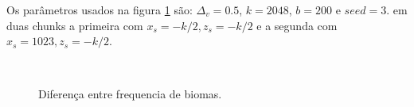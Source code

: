 Os parâmetros usados na figura \ref{fig:biomeareasanotherComp} são: $\Delta_{v} = 0.5$, 
$k = 2048$, $b = 200$ e $seed = 3$. em duas chunks a primeira com $ x_{s} = -k/2 , z_{s} = -k/2$
e a segunda com $ x_{s} = 1023 , z_{s} = -k/2$.

\begin{figure}[H]
     \centering
     \hspace{0.1cm}
     \\
     \hspace{0.1cm}
     \caption{Diferença entre frequencia de biomas.}
     
     \label{fig:biomeareasanotherComp}
\end{figure}

